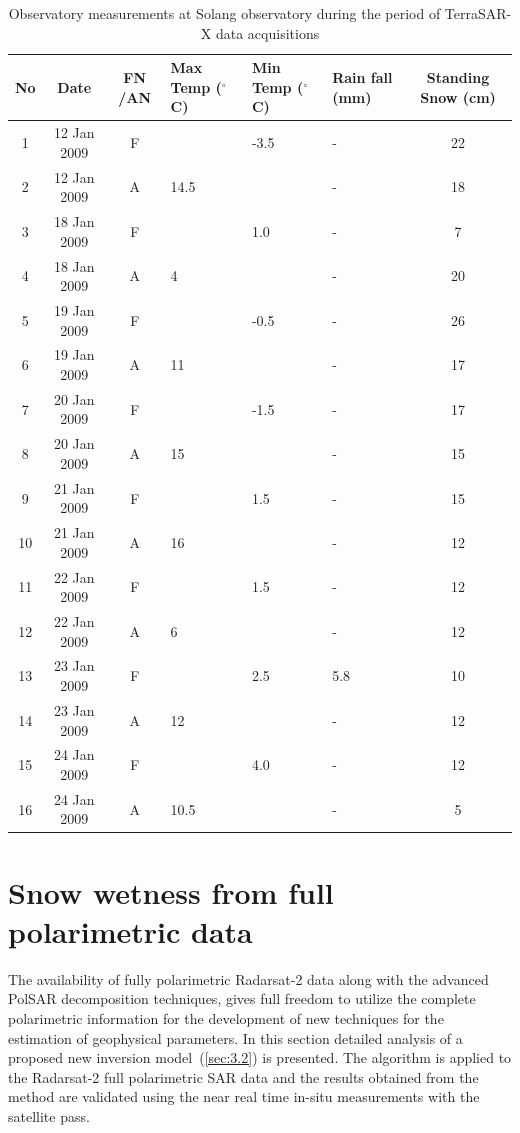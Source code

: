 \begin{table}[!htbp]
	\caption [Observatory measurements during TerraSAR-X data acquisitions]{Observatory measurements at Solang observatory during the period of TerraSAR-X data acquisitions}
	\begin{center}
		\begin{tabular}{| c | c | c | p{1.5cm} | p{1.5cm} | p{1.5cm} | c |} \hline
			No & Date  & FN /AN  & Max Temp ($^\circ$C)  & Min Temp ($^\circ$C)  & Rain fall (mm)  & Standing Snow (cm)\\ \hline \hline
			1 & 12 Jan 2009 & F  &      & -3.5 &-  & 22\\ \hline
			2 & 12 Jan 2009 & A  & 14.5 &      &-  & 18\\ \hline 
			3 & 18 Jan 2009 & F  &      & 1.0  &-  & 7\\ \hline
			4 & 18 Jan 2009 & A  &  4   &      &-  & 20\\ \hline 
			5 & 19 Jan 2009 & F  &      & -0.5 &-  & 26\\ \hline
			6 & 19 Jan 2009 & A  &  11  &      &-  & 17\\ \hline 
			7 & 20 Jan 2009 & F  &      & -1.5 &-  & 17\\ \hline
			8 & 20 Jan 2009 & A  &  15  &      &-  & 15\\ \hline 
			9 & 21 Jan 2009 & F  &      & 1.5  &-  & 15\\ \hline
			10 & 21 Jan 2009 & A &  16  &      &-  & 12\\ \hline 
			11 & 22 Jan 2009 & F &      & 1.5  &-  & 12\\ \hline
			12 & 22 Jan 2009 & A &  6   &      &-  & 12\\ \hline 
			13 & 23 Jan 2009 & F &      & 2.5  & 5.8 & 10\\ \hline
			14 & 23 Jan 2009 & A &  12  &      &-  & 12\\ \hline 
			15 & 24 Jan 2009 & F &      & 4.0  &-  & 12\\ \hline
			16 & 24 Jan 2009 & A &  10.5&      &- & 5\\ \hline 
		\end{tabular}
	\end{center}
	\label{table:observatory_data_dual_pol}
\end{table}
\FloatBarrier
\section{Snow wetness from full polarimetric data}
\FloatBarrier
The availability of fully polarimetric Radarsat-2 data along with the advanced PolSAR decomposition techniques, gives full freedom to utilize the complete polarimetric information for the development of new techniques for the estimation of geophysical parameters. In this section detailed analysis of a proposed new inversion model~(\cref{sec:3.2}) is presented. The algorithm is applied to the Radarsat-2 full polarimetric SAR data and the results obtained from the method are validated using the near real time in-situ measurements with the satellite pass.

